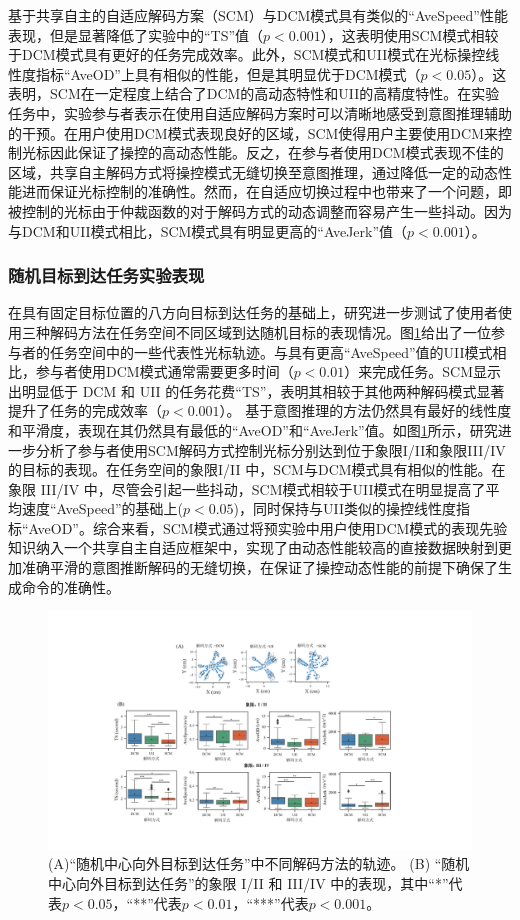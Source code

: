 基于共享自主的自适应解码方案（SCM）与DCM模式具有类似的``AveSpeed''性能表现，但是显著降低了实验中的``TS''值（$p<0.001$），这表明使用SCM模式相较于DCM模式具有更好的任务完成效率。此外，SCM模式和UII模式在光标操控线性度指标``AveOD''上具有相似的性能，但是其明显优于DCM模式（$p<0.05$）。这表明，SCM在一定程度上结合了DCM的高动态特性和UII的高精度特性。在实验任务中，实验参与者表示在使用自适应解码方案时可以清晰地感受到意图推理辅助的干预。在用户使用DCM模式表现良好的区域，SCM使得用户主要使用DCM来控制光标因此保证了操控的高动态性能。反之，在参与者使用DCM模式表现不佳的区域，共享自主解码方式将操控模式无缝切换至意图推理，通过降低一定的动态性能进而保证光标控制的准确性。然而，在自适应切换过程中也带来了一个问题，即被控制的光标由于仲裁函数的对于解码方式的动态调整而容易产生一些抖动。因为与DCM和UII模式相比，SCM模式具有明显更高的``AveJerk''值（$p<0.001$）。

\subsubsection{随机目标到达任务实验表现}在具有固定目标位置的八方向目标到达任务的基础上，研究进一步测试了使用者使用三种解码方法在任务空间不同区域到达随机目标的表现情况。图\ref{fig:3-12}给出了一位参与者的任务空间中的一些代表性光标轨迹。与具有更高``AveSpeed''值的UII模式相比，参与者使用DCM模式通常需要更多时间（$p<0.01$）来完成任务。SCM显示出明显低于 DCM 和 UII 的任务花费``TS''，表明其相较于其他两种解码模式显著提升了任务的完成效率（$p<0.001$）。 基于意图推理的方法仍然具有最好的线性度和平滑度，表现在其仍然具有最低的``AveOD''和``AveJerk''值。如图\ref{fig:3-12}所示，研究进一步分析了参与者使用SCM解码方式控制光标分别达到位于象限I/II和象限III/IV的目标的表现。在任务空间的象限I/II 中，SCM与DCM模式具有相似的性能。在象限 III/IV 中，尽管会引起一些抖动，SCM模式相较于UII模式在明显提高了平均速度``AveSpeed''的基础上($p<0.05$)，同时保持与UII类似的操控线性度指标``AveOD''。综合来看，SCM模式通过将预实验中用户使用DCM模式的表现先验知识纳入一个共享自主自适应框架中，实现了由动态性能较高的直接数据映射到更加准确平滑的意图推断解码的无缝切换，在保证了操控动态性能的前提下确保了生成命令的准确性。  

\begin{figure}[htb]
    \includegraphics[width=1\textwidth]{figures/3-Fig-12.pdf}
    \caption{(A)“随机中心向外目标到达任务”中不同解码方法的轨迹。 (B) “随机中心向外目标到达任务”的象限 I/II 和 III/IV 中的表现，其中“*”代表$p<0.05$，“**”代表$p<0.01$，“***”代表$p<0.001$。}
    \label{fig:3-12}
\end{figure}

